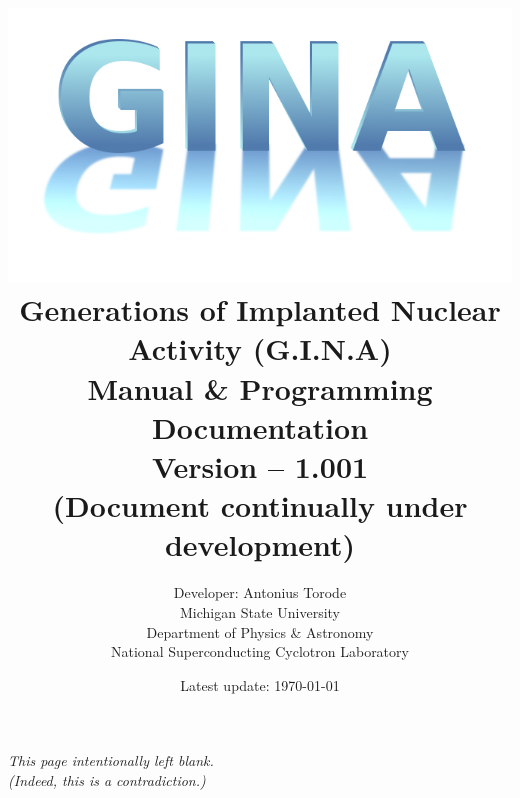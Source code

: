 \documentclass[openany,a4paper,11pt]{book}
\title{\includegraphics[scale =0.5]{./Images/gina.png} \\ Generations of Implanted Nuclear Activity (G.I.N.A) \\  Manual \& Programming Documentation \\ Version -- 1.001 \\ (Document continually under development) \\ \vspace{1cm}  
}
\author{Developer: Antonius Torode \\ Michigan State University \\ Department of Physics \& Astronomy \\ National Superconducting Cyclotron Laboratory}
\date{Latest update: \today}
\begin{document}
\frontmatter
\maketitle

\tableofcontents
\newpage
\vspace*{\fill}
\begin{center}
	\textit{This page intentionally left blank. \\ (Indeed, this is a contradiction.)}
\end{center}
\vspace*{\fill}

\mainmatter
\pagestyle{fancy}
\fancyhf{}
\fancyhead[RO, LE]{\thepage}









\backmatter


\end{document}
